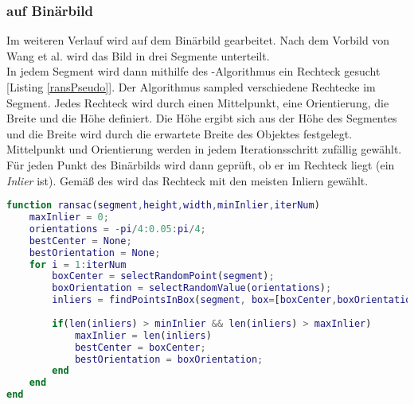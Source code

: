 \subsubsection{\rans auf Binärbild}
Im weiteren Verlauf wird auf dem  Binärbild gearbeitet. Nach dem Vorbild von Wang et al. \cite{wang2004lane} wird das Bild in drei Segmente unterteilt.\\
In jedem Segment wird dann mithilfe des \rans -Algorithmus ein Rechteck gesucht [Listing \ref{ransPseudo}]. Der Algorithmus sampled verschiedene Rechtecke im Segment. Jedes Rechteck wird durch einen Mittelpunkt, eine Orientierung, die Breite und die Höhe definiert. Die Höhe ergibt sich aus der Höhe des Segmentes und die Breite wird durch die erwartete Breite des Objektes festgelegt. Mittelpunkt und Orientierung werden in jedem Iterationsschritt zufällig gewählt.\\
Für jeden Punkt des Binärbilds wird dann geprüft, ob er im Rechteck liegt (ein \textit{Inlier} ist). Gemäß des \rans wird das Rechteck mit den meisten Inliern gewählt.\\
\begin{lstlisting}[language=Matlab,caption={Eingesetzter \rans als Pseudocode.},label=ransPseudo]
function ransac(segment,height,width,minInlier,iterNum)
	maxInlier = 0;
	orientations = -pi/4:0.05:pi/4;
	bestCenter = None;
	bestOrientation = None;
	for i = 1:iterNum
		boxCenter = selectRandomPoint(segment);
		boxOrientation = selectRandomValue(orientations);
		inliers = findPointsInBox(segment, box=[boxCenter,boxOrientation,height,width]);
		
		if(len(inliers) > minInlier && len(inliers) > maxInlier)
			maxInlier = len(inliers)
			bestCenter = boxCenter;
			bestOrientation = boxOrientation;
		end
	end
end
\end{lstlisting}

